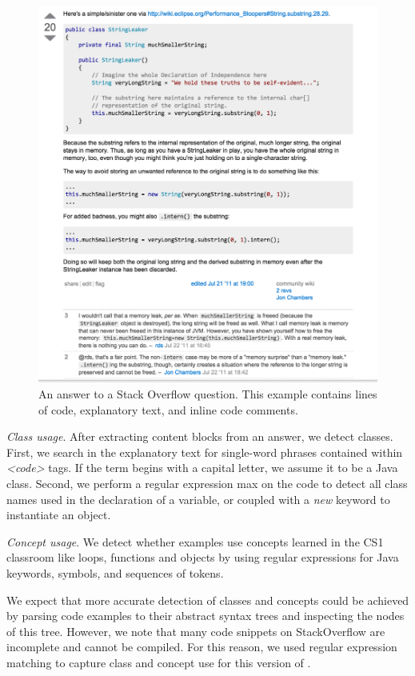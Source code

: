\begin{figure}
 \centering
 \includegraphics[width=.85\columnwidth]{figures/so_answer}
 \caption{An answer to a Stack Overflow question.  This example contains lines of code, explanatory text, and inline code comments.}
 \label{fig:so_answer}
\end{figure}

\emph{Class usage}.
After extracting content blocks from an answer, we detect classes.
First, we search in the explanatory text for single-word phrases contained within \emph{\textless{}code\textgreater{}} tags.
If the term begins with a capital letter, we assume it to be a Java class.
Second, we perform a regular expression max on the code to detect all class names used in the declaration of a variable, or coupled with a \emph{new} keyword to instantiate an object.

\emph{Concept usage}.
We detect whether examples use concepts learned in the CS1 classroom like loops, functions and objects by using regular expressions for Java keywords, symbols, and sequences of tokens.

We expect that more accurate detection of classes and concepts could be achieved by parsing code examples to their abstract syntax trees and inspecting the nodes of this tree.
However, we note that many code snippets on StackOverflow are incomplete and cannot be compiled.
For this reason, we used regular expression matching to capture class and concept use for this version of \systemname{}.